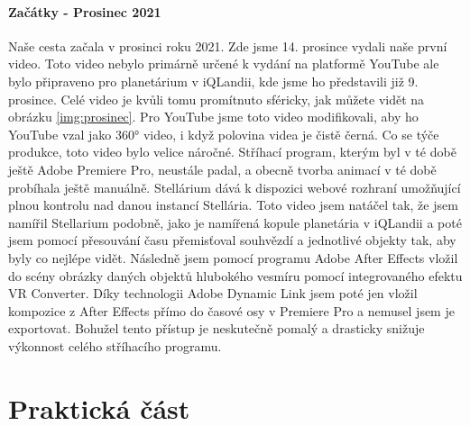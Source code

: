 \documentclass[12pt,a4paper,titlepage]{article}
\begin{document}
\subsection{Začátky - Prosinec 2021}
Naše cesta začala v prosinci roku 2021. Zde jsme 14. prosince vydali naše první video. Toto video nebylo primárně určené k vydání na platformě YouTube ale bylo připraveno pro planetárium v iQLandii, kde jsme ho představili již 9. prosince. Celé video je kvůli tomu promítnuto sféricky, jak můžete vidět na obrázku \ref{img:prosinec}. Pro YouTube jsme toto video modifikovali, aby ho YouTube vzal jako 360° video, i když polovina videa je čistě černá. Co se týče produkce, toto video bylo velice náročné. Stříhací program, kterým byl v té době ještě Adobe Premiere Pro, neustále padal, a obecně tvorba animací v té době probíhala ještě manuálně. Stellárium dává k dispozici webové rozhraní umožňující plnou kontrolu nad danou instancí Stellária. Toto video jsem natáčel tak, že jsem namířil Stellarium podobně, jako je namířená kopule planetária v iQLandii a poté jsem pomocí přesouvání času přemisťoval souhvězdí a jednotlivé objekty tak, aby byly co nejlépe vidět. Následně jsem pomocí programu Adobe After Effects vložil do scény obrázky daných objektů hlubokého vesmíru pomocí integrovaného efektu VR Converter. Díky technologii Adobe Dynamic Link jsem poté jen vložil kompozice z After Effects přímo do časové osy v Premiere Pro a nemusel jsem je exportovat. Bohužel tento přístup je neskutečně pomalý a drasticky snižuje výkonnost celého stříhacího programu. 
\newpage
\part{Praktická část}
\newpage
\end{document}
